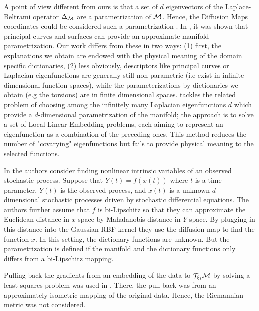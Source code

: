 A point of view different from ours is that a set of $d$ eigenvectors of
the Laplace-Beltrami operator $\Delta_{{\cal M}}$ are a parametrization of
${\cal M}$. Hence, the Diffusion Maps coordinates could be considered such a
parametrization \citep{coifman:06,CoiLafLeeMag05,Gear2012-rj}.  In
\citet{mohammedNarayanan:localpcs17}, it was shown that principal curves
and surfaces can provide an approximate manifold parametrization. Our
work differs from these in two ways: (1) first, the
explanations we obtain are endowed with the physical meaning of the
domain specific dictionaries, (2) less obviously, descriptors like
principal curves or Laplacian eigenfunctions are generally still
non-parametric (i.e exist in infinite dimensional function spaces),
while the parameterizations by dictionaries we obtain (e.g the
torsions) are in finite dimensional spaces. \citet{Dsilva2018-dz} tackles the
related problem of choosing among the infinitely many Laplacian
eigenfunctions $d$ which provide a $d$-dimensional parametrization of
the manifold; the approach is to solve a set of Local Linear Embedding
\citep{roweis:00} problems, each aiming to represent an eigenfunction
as a combination of the preceding ones. This method reduces the number of "covarying" eigenfunctions but fails to provide physical meaning to the selected functions. 

In \citet{Dsilva13-Nonlinear} the authors consider finding nonlinear intrinsic variables of an observed stochastic process. Suppose that $Y(t)=f(x(t))$ where $t$ is a time parameter, $Y(t)$ is the observed process, and $x(t)$ is a unknown $d-$dimensional stochastic processes driven by stochastic differential equations. The authors further assume that $f$ is bi-Lipschitz so that they can approximate the Euclidean distance in $x$ space by Mahalanobis distance in $Y$ space.  By plugging in this distance into the Gaussian RBF kernel they use the diffusion map to find the function $x$. In this setting, the dictionary functions are unknown. But the parametrization is defined if the manifold and the dictionary functions only differs from a bi-Lipschitz mapping.

Pulling back the gradients from an embedding of the data to ${\cal T}_{\xi_i}{\cal M}$ by solving a least squares problem was used in \citet{Luo2009-mp}. There, the pull-back was from an approximately isometric mapping of the original data. Hence, the Riemannian metric was not considered. 


